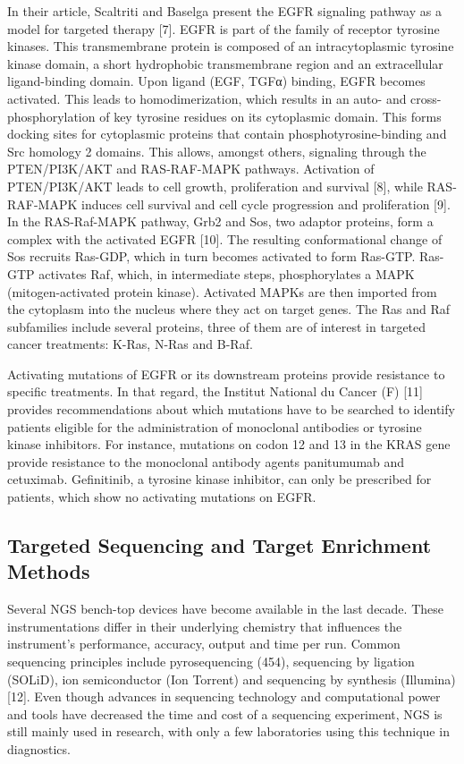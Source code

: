 In their article, Scaltriti and Baselga present the EGFR signaling pathway as a
model for targeted therapy [7]. EGFR is part of the family of receptor tyrosine
kinases. This transmembrane protein is composed of an intracytoplasmic tyrosine
kinase domain, a short hydrophobic transmembrane region and an extracellular
ligand-binding domain. Upon ligand (EGF, TGFα) binding, EGFR becomes activated.
This leads to homodimerization, which results in an auto- and
cross-phosphorylation of key tyrosine residues on its cytoplasmic domain. This
forms docking sites for cytoplasmic proteins that contain
phosphotyrosine-binding and Src homology 2 domains. This allows, amongst others,
signaling through the PTEN/PI3K/AKT and RAS-RAF-MAPK pathways. Activation of
PTEN/PI3K/AKT leads to cell growth, proliferation and survival [8], while
RAS-RAF-MAPK induces cell survival and cell cycle progression and proliferation
[9]. In the RAS-Raf-MAPK pathway, Grb2 and Sos, two adaptor proteins, form a
complex with the activated EGFR [10]. The resulting conformational change of Sos
recruits Ras-GDP, which in turn becomes activated to form Ras-GTP. Ras-GTP
activates Raf, which, in intermediate steps, phosphorylates a MAPK
(mitogen-activated protein kinase). Activated MAPKs are then imported from the
cytoplasm into the nucleus where they act on target genes. The Ras and Raf
subfamilies include several proteins, three of them are of interest in targeted
cancer treatments: K-Ras, N-Ras and B-Raf.


Activating mutations of EGFR or its downstream proteins provide resistance to
specific treatments. In that regard, the Institut National du Cancer (F) [11]
provides recommendations about which mutations have to be searched to identify
patients eligible for the administration of monoclonal antibodies or tyrosine
kinase inhibitors. For instance, mutations on codon 12 and 13 in the KRAS gene
provide resistance to the monoclonal antibody agents panitumumab and cetuximab.
Gefinitinib, a tyrosine kinase inhibitor, can only be prescribed for patients,
which show no activating mutations on EGFR.

\subsection{Targeted Sequencing and Target Enrichment Methods}
Several NGS bench-top devices have become available in the last decade. These
instrumentations differ in their underlying chemistry that influences the
instrument’s performance, accuracy, output and time per run. Common sequencing
principles include pyrosequencing (454), sequencing by ligation (SOLiD), ion
semiconductor (Ion Torrent) and sequencing by synthesis (Illumina) [12]. Even
though advances in sequencing technology and computational power and tools have
decreased the time and cost of a sequencing experiment, NGS is still mainly used
in research, with only a few laboratories using this technique in diagnostics.

